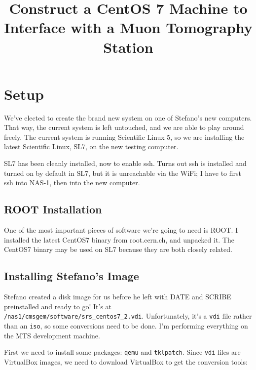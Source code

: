 \documentclass[12pt]{article}
\begin{document}

\title{Construct a CentOS 7 Machine to Interface with a Muon Tomography Station}

\maketitle 




\section{Setup}

\qq We've elected to create the brand new system on one of Stefano's new
computers. That way, the current system is left untouched, and we are able to
play around freely. The current system is running Scientific Linux 5, so we are
installing the latest Scientific Linux, SL7, on the new testing computer. 

\qq SL7 has been cleanly installed, now to enable ssh. Turns out ssh is
installed and turned on by default in SL7, but it is unreachable via the WiFi; I
have to first ssh into NAS-1, then into the new computer.

\subsection{ROOT Installation}

\qq One of the most important pieces of software we're going to need is ROOT. I
installed the latest CentOS7 binary from root.cern.ch, and unpacked it. The
CentOS7 binary may be used on SL7 because they are both closely related. 

\subsection{Installing Stefano's Image}

\qq Stefano created a disk image for us before he left with DATE and SCRIBE
preinstalled and ready to go! It's at {\tt
  /nas1/cmsgem/software/srs\_centos7\_2.vdi}. Unfortunately, it's a {\tt vdi} file
rather than an {\tt iso}, so some conversions need to be done. I'm performing
everything on the MTS development machine.

\qq First we need to install some packages: {\tt qemu} and {\tt tklpatch}.
Since {\tt vdi} files are VirtualBox images, we need to download VirtualBox to
get the conversion tools:
\end{document}
